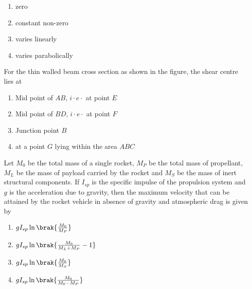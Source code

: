     \begin{enumerate}
        \item zero
        \item constant non-zero
        \item varies linearly
        \item varies parabolically
    \end{enumerate}
    \item For the thin walled beam cross section as shown in the figure, the shear centre lies at 

    \begin{enumerate}
        \item Mid point of $AB$, $i\cdot e\cdot$ at point $E$
        \item Mid point of $BD$, $i\cdot e\cdot$ at point $F$
        \item Junction point $B$
        \item at a point $G$ lying within the area $ABC$
    \end{enumerate}
    \item Let $M_0$ be the total mass of a single rocket, $M_P$ be the total mass of propellant, $M_L$ be the mass of payload carried by the rocket and $M_S$ be the mass of inert structural components. If $I_{sp}$ is the specific impulse of the propulsion system  and $g$ is the acceleration  due to gravity, then the maximum velocity that can be attained by the rocket vehicle in absence of gravity and atmospheric drag is given by
    \begin{enumerate}
        \item $gI_{sp}\ln\brak{\frac{M_0}{M_P}}$
        \item $gI_{sp}\ln\brak{\frac{M_0}{M_L+M_P}-1}$
        \item $gI_{sp}\ln\brak{\frac{M_0}{M_S}}$
        \item $gI_{sp}\ln\brak{\frac{M_0}{M_0-M_P}}$
    \end{enumerate}
